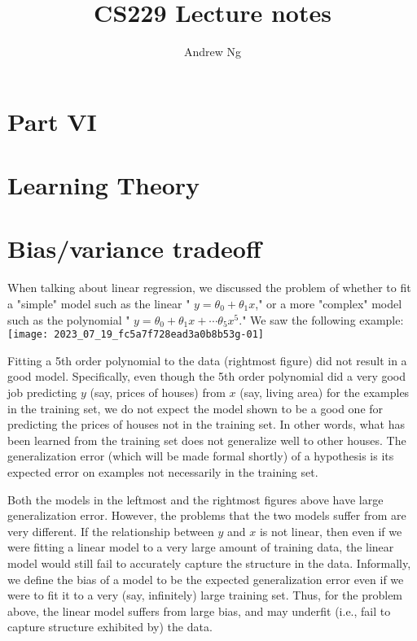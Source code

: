 \documentclass[10pt]{article}
\title{CS229 Lecture notes }
\author{Andrew Ng}
\date{}
\begin{document}
\maketitle


\section{Part VI}
\section{Learning Theory}
\section{Bias/variance tradeoff}
When talking about linear regression, we discussed the problem of whether to fit a "simple" model such as the linear " \(y=\theta_{0}+\theta_{1} x\)," or a more "complex" model such as the polynomial " \(y=\theta_{0}+\theta_{1} x+\cdots \theta_{5} x^{5}\)." We saw the following example:
\texttt{[image: 2023\_07\_19\_fc5a7f728ead3a0b8b53g-01]}

Fitting a 5th order polynomial to the data (rightmost figure) did not result in a good model. Specifically, even though the 5th order polynomial did a very good job predicting \(y\) (say, prices of houses) from \(x\) (say, living area) for the examples in the training set, we do not expect the model shown to be a good one for predicting the prices of houses not in the training set. In other words, what has been learned from the training set does not generalize well to other houses. The generalization error (which will be made formal shortly) of a hypothesis is its expected error on examples not necessarily in the training set.

Both the models in the leftmost and the rightmost figures above have large generalization error. However, the problems that the two models suffer from are very different. If the relationship between \(y\) and \(x\) is not linear, then even if we were fitting a linear model to a very large amount of training data, the linear model would still fail to accurately capture the structure in the data. Informally, we define the bias of a model to be the expected generalization error even if we were to fit it to a very (say, infinitely) large training set. Thus, for the problem above, the linear model suffers from large bias, and may underfit (i.e., fail to capture structure exhibited by) the data.
\end{document}
